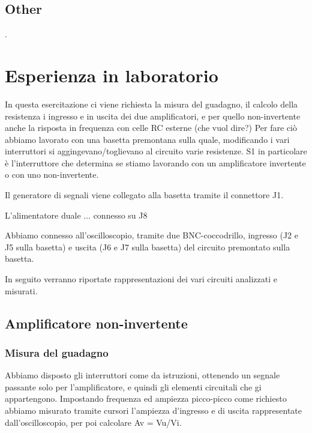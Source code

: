 \documentclass[a4paper]{article}
\begin{document}
		\subsection{Other}
			.
	\section{Esperienza in laboratorio}
		In questa esercitazione ci viene richiesta la misura del guadagno, il calcolo della resistenza i ingresso e in uscita dei due amplificatori, e per quello non-invertente anche la risposta in frequenza con celle RC esterne (che vuol dire?)
		Per fare ciò abbiamo lavorato con una basetta premontana sulla quale, modificando i vari interruttori si aggingevano/toglievano al circuito varie resistenze.
		S1 in particolare è l'interruttore che determina se stiamo lavorando con un amplificatore invertente o con uno non-invertente.
		
		Il generatore di segnali viene collegato alla basetta tramite il connettore J1.
		
		L'alimentatore duale ... connesso su J8
		
		Abbiamo connesso all'oscilloscopio, tramite due BNC-coccodrillo, ingresso (J2 e J5 sulla basetta)
		e uscita (J6 e J7 sulla basetta) del circuito premontato sulla basetta. %
		
		In seguito verranno riportate rappresentazioni dei vari circuiti analizzati e misurati.
		\subsection{Amplificatore non-invertente}
			\subsubsection{Misura del guadagno}
				Abbiamo disposto gli interruttori come da istruzioni, ottenendo un segnale passante solo per l'amplificatore, e quindi gli elementi circuitali che gi appartengono. %
				Impostando frequenza ed ampiezza picco-picco come richiesto abbiamo misurato tramite cursori l'ampiezza d'ingresso e di uscita rappresentate dall'oscilloscopio, per poi calcolare Av = Vu/Vi.
\end{document}
